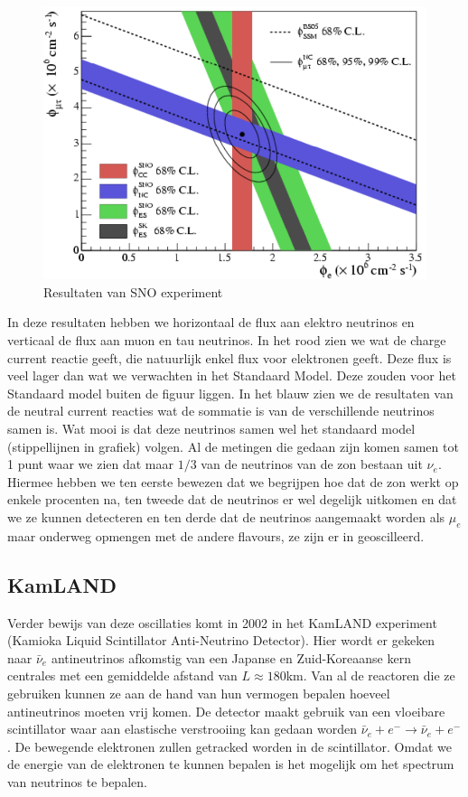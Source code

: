 \documentclass[../main.tex]{subfiles}
\begin{document}
\begin{figure}[h]
    \centering
    \includegraphics[width=0.5\linewidth]{neutrinos/sno_resultaten.png}
    \caption{Resultaten van SNO experiment}%
    \label{fig:neutrinos/sno_resultaten}
\end{figure}

In deze resultaten hebben we horizontaal de flux aan elektro neutrinos en verticaal de flux aan muon en tau neutrinos. In het rood zien we wat de charge current reactie geeft, die natuurlijk enkel flux voor elektronen geeft. Deze flux is veel lager dan wat we verwachten in het Standaard Model. Deze zouden voor het Standaard model buiten de figuur liggen. In het blauw zien we de resultaten van de neutral current reacties wat de sommatie is van de verschillende neutrinos samen is. Wat mooi is dat deze neutrinos samen wel het standaard model (stippellijnen in grafiek) volgen. Al de metingen die gedaan zijn komen samen tot 1 punt waar we zien dat maar $1/3$ van de neutrinos van de zon bestaan uit $\nu_e$.\\
Hiermee hebben we ten eerste bewezen dat we begrijpen hoe dat de zon werkt op enkele procenten na, ten tweede dat de neutrinos er wel degelijk uitkomen en dat we ze kunnen detecteren en ten derde dat de neutrinos aangemaakt worden als $\mu_e$ maar onderweg opmengen met de andere flavours, ze zijn er in geoscilleerd.

\subsection{KamLAND}%
\label{sub:kamland}

Verder bewijs van deze oscillaties komt in 2002 in het KamLAND experiment (Kamioka Liquid Scintillator Anti-Neutrino
Detector). Hier wordt er gekeken naar $\bar{\nu}_e$ antineutrinos afkomstig van een Japanse en Zuid-Koreaanse kern centrales met een gemiddelde afstand van $L\approx180$km. Van al de reactoren die ze gebruiken kunnen ze aan de hand van hun vermogen bepalen hoeveel antineutrinos moeten vrij komen. De detector maakt gebruik van een vloeibare scintillator waar aan elastische verstrooiing kan gedaan worden $\bar{\nu}_{e}+e^{-} \rightarrow \bar{\nu}_{e}+e^{-}$. De bewegende elektronen zullen getracked worden in de scintillator. Omdat we de energie van de elektronen te kunnen bepalen is het mogelijk om het spectrum van neutrinos te bepalen.
\end{document}
